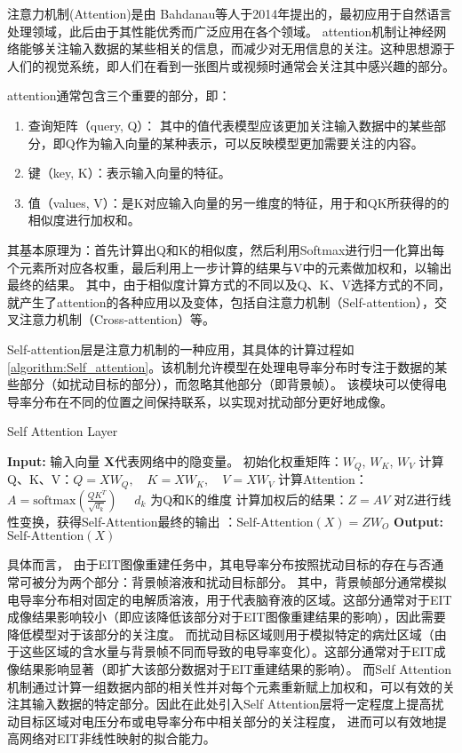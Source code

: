 注意力机制(Attention)是由 Bahdanau等人于2014年提出的\cite{2014Neural}，最初应用于自然语言处理领域，此后由于其性能优秀而广泛应用在各个领域。
attention机制让神经网络能够关注输入数据的某些相关的信息，而减少对无用信息的关注。这种思想源于人们的视觉系统，即人们在看到一张图片或视频时通常会关注其中感兴趣的部分。

attention通常包含三个重要的部分，即：
\begin{enumerate}
  \item 查询矩阵（query, Q）： 其中的值代表模型应该更加关注输入数据中的某些部分，即Q作为输入向量的某种表示，可以反映模型更加需要关注的内容。
  \item 键（key, K）：表示输入向量的特征。
  \item 值（values, V）：是K对应输入向量的另一维度的特征，用于和QK所获得的的相似度进行加权和。
\end{enumerate}

其基本原理为：首先计算出Q和K的相似度，然后利用Softmax进行归一化算出每个元素所对应各权重，最后利用上一步计算的结果与V中的元素做加权和，以输出最终的结果。
其中，由于相似度计算方式的不同以及Q、K、V选择方式的不同，就产生了attention的各种应用以及变体，包括自注意力机制（Self-attention），交叉注意力机制（Cross-attention）等。

Self-attention层是注意力机制的一种应用，其具体的计算过程如\cref{algorithm:Self_attention}。该机制允许模型在处理电导率分布时专注于数据的某些部分（如扰动目标的部分），而忽略其他部分（即背景帧）。
该模块可以使得电导率分布在不同的位置之间保持联系，以实现对扰动部分更好地成像。

\begin{algorithm}

\caption{Self Attention Layer}
\begin{algorithmic}[1]
    \State \textbf{Input:} 输入向量 $\boldsymbol{X}$代表网络中的隐变量。
    \State 初始化权重矩阵：$W_Q$, $W_K$, $W_V$
    \State 计算Q、K、V：$Q = XW_Q, \quad K = XW_K, \quad V = XW_V$
    \State 计算Attention：$A = \text{softmax}\left(\frac{QK^T}{\sqrt{d_k}}\right) \quad $ $d_k$ 为Q和K的维度 
    \State 计算加权后的结果：$Z = AV$
    \State 对Z进行线性变换，获得Self-Attention最终的输出 ：$\text{Self-Attention}(X) = ZW_O$
    \State \textbf{Output:} $\text{Self-Attention}(X)$
\end{algorithmic}
\label{algorithm:Self_attention}
\end{algorithm}

具体而言， 由于EIT图像重建任务中，其电导率分布按照扰动目标的存在与否通常可被分为两个部分：背景帧溶液和扰动目标部分。
其中，背景帧部分通常模拟电导率分布相对固定的电解质溶液，用于代表脑脊液的区域。这部分通常对于EIT成像结果影响较小（即应该降低该部分对于EIT图像重建结果的影响），因此需要降低模型对于该部分的关注度。
而扰动目标区域则用于模拟特定的病灶区域（由于这些区域的含水量与背景帧不同而导致的电导率变化）。这部分通常对于EIT成像结果影响显著（即扩大该部分数据对于EIT重建结果的影响）。
而Self Attention机制通过计算一组数据内部的相关性并对每个元素重新赋上加权和，可以有效的关注其输入数据的特定部分。因此在此处引入Self Attention层将一定程度上提高扰动目标区域对电压分布或电导率分布中相关部分的关注程度，
进而可以有效地提高网络对EIT非线性映射的拟合能力。

